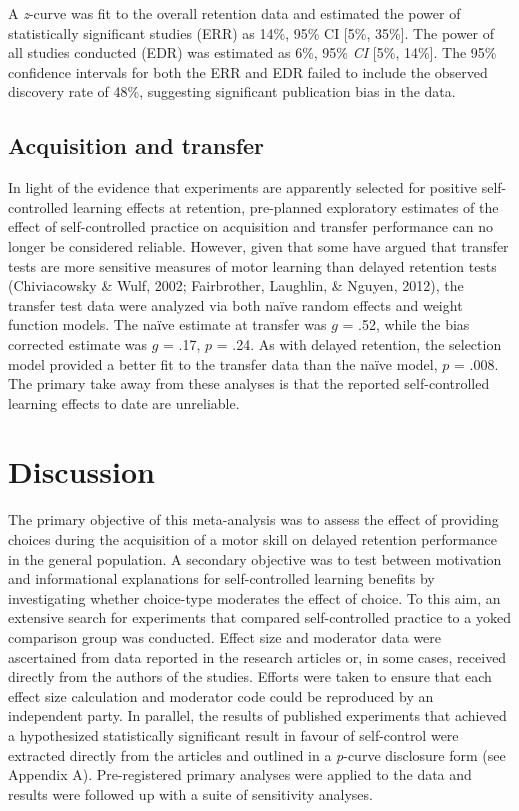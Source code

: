 \documentclass[
  english,
  man, donotrepeattitle,floatsintext]{apa7}
\begin{document}
A \emph{z}-curve was fit to the overall retention data and estimated the power of statistically significant studies (ERR) as 14\%, 95\% CI {[}5\%, 35\%{]}. The power of all studies conducted (EDR) was estimated as 6\%, 95\% \emph{CI} {[}5\%, 14\%{]}. The 95\% confidence intervals for both the ERR and EDR failed to include the observed discovery rate of 48\%, suggesting significant publication bias in the data.

\hypertarget{acquisition-and-transfer}{%
\subsection{Acquisition and transfer}\label{acquisition-and-transfer}}

In light of the evidence that experiments are apparently selected for positive self-controlled learning effects at retention, pre-planned exploratory estimates of the effect of self-controlled practice on acquisition and transfer performance can no longer be considered reliable. However, given that some have argued that transfer tests are more sensitive measures of motor learning than delayed retention tests (Chiviacowsky \& Wulf, 2002; Fairbrother, Laughlin, \& Nguyen, 2012), the transfer test data were analyzed via both naïve random effects and weight function models. The naïve estimate at transfer was \(g\) = .52, while the bias corrected estimate was \(g\) = .17, \(p\) = .24. As with delayed retention, the selection model provided a better fit to the transfer data than the naïve model, \(p\) = .008. The primary take away from these analyses is that the reported self-controlled learning effects to date are unreliable.

\hypertarget{discussion}{%
\section{Discussion}\label{discussion}}

The primary objective of this meta-analysis was to assess the effect of providing choices during the acquisition of a motor skill on delayed retention performance in the general population. A secondary objective was to test between motivation and informational explanations for self-controlled learning benefits by investigating whether choice-type moderates the effect of choice. To this aim, an extensive search for experiments that compared self-controlled practice to a yoked comparison group was conducted. Effect size and moderator data were ascertained from data reported in the research articles or, in some cases, received directly from the authors of the studies. Efforts were taken to ensure that each effect size calculation and moderator code could be reproduced by an independent party. In parallel, the results of published experiments that achieved a hypothesized statistically significant result in favour of self-control were extracted directly from the articles and outlined in a \emph{p}-curve disclosure form (see Appendix A). Pre-registered primary analyses were applied to the data and results were followed up with a suite of sensitivity analyses.
\end{document}
